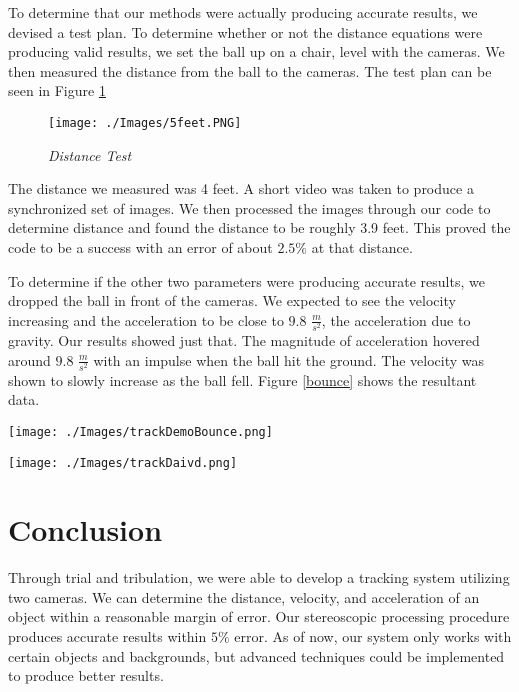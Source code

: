 \documentclass{IEEEtran}
\begin{document}
To determine that our methods were actually producing accurate results, we devised a test plan. To determine whether or not the distance equations were producing valid results, we set the ball up on a chair, level with the cameras. We then measured the distance from the ball to the cameras. The test plan can be seen in Figure \ref{distanceTest}
 
 \begin{figure}[httb]
  \centering
  \texttt{[image: ./Images/5feet.PNG]}
  \caption{\emph{Distance Test}}
  \label{distanceTest}
\end{figure}

The distance we measured was 4 feet. A short video was taken to produce a synchronized set of images. We then processed the images through our code to determine distance and found the distance to be roughly 3.9 feet. This proved the code to be a success with an error of about $2.5\%$ at that distance.


To determine if the other two parameters were producing accurate results, we dropped the ball in front of the cameras. We expected to see the velocity increasing and the acceleration to be close to $9.8$ $\frac{m}{s^2}$, the acceleration due to gravity. Our results showed just that. The magnitude of acceleration hovered around $9.8$ $\frac{m}{s^2}$ with an impulse when the ball hit the ground. The velocity was shown to slowly increase as the ball fell. Figure \ref{bounce} shows the resultant data.

 \begin{figure*}[httb]
  \centering
  \texttt{[image: ./Images/trackDemoBounce.png]}
  \caption{\emph{Tracking a Ballistic Object}}
  \label{bounce}
\end{figure*}


 \begin{figure*}[httb]
  \centering
  \texttt{[image: ./Images/trackDaivd.png]}
  \caption{\emph{Tracking a ball against a non-ballistic trajectory}}
  \label{davidTrack}
\end{figure*}


\section{Conclusion}
Through trial and tribulation, we were able to develop a tracking system utilizing two cameras. We can determine the distance, velocity, and acceleration of an object within a reasonable margin of error. Our stereoscopic processing procedure produces accurate results within $5\%$ error. As of now, our system only works with certain objects and backgrounds, but advanced techniques could be implemented to produce better results.
\end{document}
